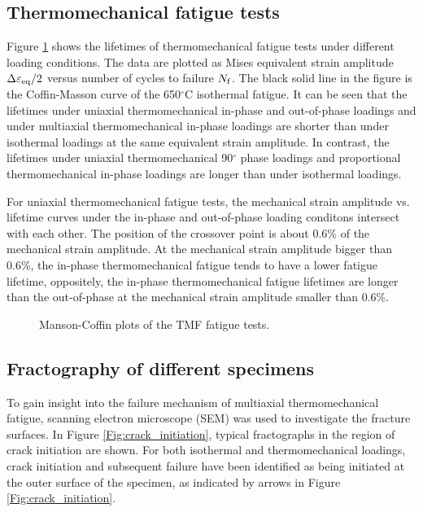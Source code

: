 \documentclass[preprint,5p,twocolumn,11pt,sort&compress]{elsarticle}
\begin{document}
\subsection{Thermomechanical fatigue tests}

Figure \ref{Fig:plot_exp_fatigue_life} shows the lifetimes of thermomechanical fatigue tests under different loading conditions. The data are plotted as Mises equivalent strain amplitude $\Delta\varepsilon_{\rm eq}/2$ versus number of cycles to failure $N_{\rm f}$. The black solid line in the figure is the Coffin-Masson curve of the 650$^\circ$C isothermal fatigue. It can be seen that the lifetimes under uniaxial thermomechanical in-phase and out-of-phase loadings and under multiaxial thermomechanical in-phase loadings are shorter than under isothermal loadings at the same equivalent strain amplitude.
In contrast, the lifetimes under uniaxial thermomechanical 90$^\circ$ phase loadings and proportional thermomechanical in-phase loadings are longer than under isothermal loadings.

For uniaxial thermomechanical fatigue tests, the mechanical strain amplitude vs. lifetime curves under the in-phase and out-of-phase loading conditons intersect with each other. The position of the crossover point is about 0.6\% of the mechanical strain amplitude.
At the mechanical strain amplitude bigger than 0.6\%, the in-phase thermomechanical fatigue tends to have a lower fatigue lifetime, oppositely, the in-phase thermomechanical fatigue lifetimes are longer than the out-of-phase at the mechanical strain amplitude smaller than 0.6\%.

\begin{figure}[!htp]
\caption{Manson-Coffin plots of the TMF fatigue tests.}
\label{Fig:plot_exp_fatigue_life}
\end{figure}

\subsection{Fractography of different specimens}


To gain insight into the failure mechanism of multiaxial thermomechanical fatigue, scanning electron microscope (SEM) was used to investigate the fracture surfaces. In Figure \ref{Fig:crack_initiation}, typical fractographs in the region of crack initiation are shown. For both isothermal and thermomechanical loadings, crack initiation and subsequent failure have been identified as being initiated at the outer surface of the specimen, as indicated by arrows in Figure \ref{Fig:crack_initiation}. 
\end{document}
